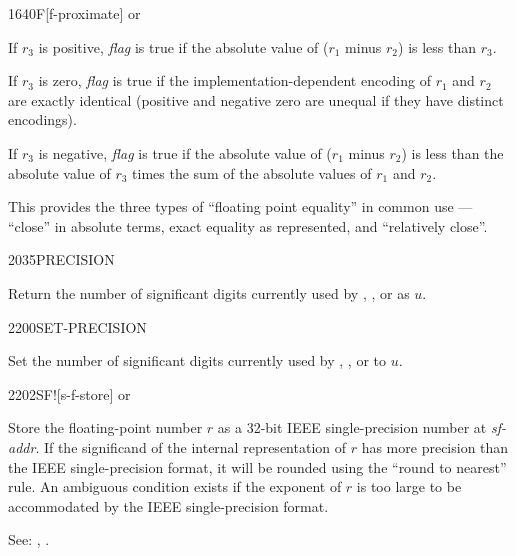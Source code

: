 \begin{newword}[Ftilde]{1640}{F\tilde}[f-proximate]
	  or

	If $r_3$ is positive, \emph{flag} is true if the absolute value
	of ($r_1$ minus $r_2$) is less than $r_3$.

	If $r_3$ is zero, \emph{flag} is true if the
	implementation-dependent encoding of $r_1$ and $r_2$ are exactly
	identical (positive and negative zero are unequal if they have
	distinct encodings).

	If $r_3$ is negative, \emph{flag} is true if the absolute value
	of ($r_1$ minus $r_2$) is less than the absolute value of $r_3$
	times the sum of the absolute values of $r_1$ and $r_2$.

	\begin{rationale} %
		This provides the three types of ``floating point equality''
		in common use --- ``close'' in absolute terms, exact equality
		as represented, and ``relatively close''.
	\end{rationale}
\end{newword}


\begin{newword}{2035}{PRECISION}

	Return the number of significant digits currently used by
	, , or  as $u$.
\end{newword}


\begin{newword}{2200}{SET-PRECISION}

	Set the number of significant digits currently used by ,
	, or  to $u$.
\end{newword}


\begin{newword}{2202}{SF!}[s-f-store]
	  or

	Store the floating-point number $r$ as a 32-bit IEEE
	single-precision number at \emph{sf-addr}. If the significand
	of the internal representation of $r$ has more precision than
	the IEEE single-precision format, it will be rounded using the
	``round to nearest'' rule. An ambiguous condition exists if the
	exponent of $r$ is too large to be accommodated by the IEEE
	single-precision format.

\item[See:]
	,
	.
\end{newword}


